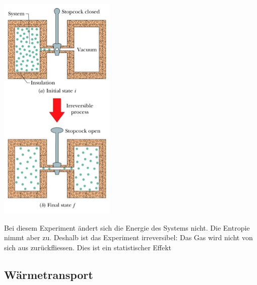 \documentclass[
a4paper,
oneside,
landscape, 
8pt,
]{scrartcl}
\begin{document}
\begin{multicols*}{2}
\begin{minipage}[h!]{0.3\linewidth}
	\includegraphics[width=0.8\linewidth]{images/entropie}
\end{minipage}
\hfill
\begin{minipage}[h!]{0.6\linewidth}
Bei diesem Experiment ändert sich die Energie des Systems nicht. Die Entropie nimmt aber zu. Deshalb ist das Experiment irreversibel: Das Gas wird nicht von sich aus zurückfliessen. Dies ist ein statistischer Effekt
\end{minipage}


\clearpage

\subsection{Wärmetransport}


\end{multicols*}
\end{document}

